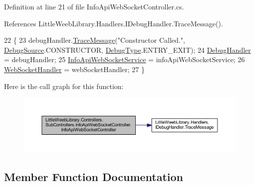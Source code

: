 Definition at line 21 of file Info\+Api\+Web\+Socket\+Controller.\+cs.



References Little\+Weeb\+Library.\+Handlers.\+I\+Debug\+Handler.\+Trace\+Message().


\begin{DoxyCode}
22         \{
23             debugHandler.\mbox{\hyperlink{interface_little_weeb_library_1_1_handlers_1_1_i_debug_handler_a2e405bc3492e683cd3702fae125221bc}{TraceMessage}}(\textcolor{stringliteral}{"Constructor Called."}, 
      \mbox{\hyperlink{namespace_little_weeb_library_1_1_handlers_a2a6ca0775121c9c503d58aa254d292be}{DebugSource}}.CONSTRUCTOR, \mbox{\hyperlink{namespace_little_weeb_library_1_1_handlers_ab66019ed40462876ec4e61bb3ccb0a62}{DebugType}}.ENTRY\_EXIT);
24             \mbox{\hyperlink{class_little_weeb_library_1_1_handlers_1_1_debug_handler}{DebugHandler}} = debugHandler;
25             \mbox{\hyperlink{class_little_weeb_library_1_1_services_1_1_info_api_web_socket_service}{InfoApiWebSocketService}} = infoApiWebSocketService;
26             \mbox{\hyperlink{class_little_weeb_library_1_1_handlers_1_1_web_socket_handler}{WebSocketHandler}} = webSocketHandler;
27         \}
\end{DoxyCode}
Here is the call graph for this function\+:\nopagebreak
\begin{figure}[H]
\begin{center}
\leavevmode
\includegraphics[width=350pt]{class_little_weeb_library_1_1_controllers_1_1_sub_controllers_1_1_info_api_web_socket_controller_a7c884b59b148f11761492b39619acf32_cgraph}
\end{center}
\end{figure}


\subsection{Member Function Documentation}
\mbox{\label{class_little_weeb_library_1_1_controllers_1_1_sub_controllers_1_1_info_api_web_socket_controller_ad620537574b819085ff8eb394add2912}} 
